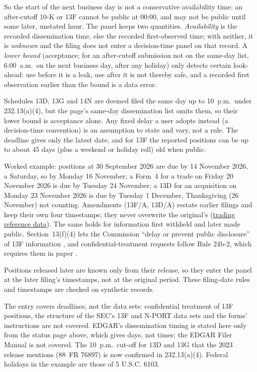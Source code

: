 \begin{qfdata}
So the start of the next business day is not a conservative availability time: an after-cutoff 10-K or 13F cannot be public at 00:00, and may not be public until some later, unstated hour. The panel keeps two quantities. \emph{Availability} is the recorded dissemination time, else the recorded first-observed time; with neither, it is \emph{unknown} and the filing does not enter a decision-time panel on that record. A \emph{lower bound} (acceptance; for an after-cutoff submission not on the same-day list, 6:00~a.m.\ on the next business day, after any holiday) only detects certain look-ahead: use before it is a leak, use after it is not thereby safe, and a recorded first observation earlier than the bound is a data error.

Schedules 13D, 13G and 14N are deemed filed the same day up to 10~p.m.\ under 232.13(a)(4), but the page's same-day dissemination list omits them, so their lower bound is acceptance alone. Any fixed delay a user adopts instead (a decision-time convention) is an assumption to state and vary, not a rule. The deadline gives only the latest date, and for 13F the reported positions can be up to about 45 days (plus a weekend or holiday roll) old when public.

Worked example: positions at 30 September 2026 are due by 14 November 2026, a Saturday, so by Monday 16 November; a Form~4 for a trade on Friday 20 November 2026 is due by Tuesday 24 November; a 13D for an acquisition on Monday 23 November 2026 is due by Tuesday 1 December, Thanksgiving (26 November) not counting. Amendments (13F/A, 13D/A) restate earlier filings and keep their own four timestamps; they never overwrite the original's (\hyperref[data:trading-reference-data]{trading reference data}). The same holds for information first withheld and later made public. Section~13(f)(4) lets the Commission ``delay or prevent public disclosure'' of 13F information \citep[15 U.S.C. 78m(f)(4), 2023 edition]{usc-15-78m}, and confidential-treatment requests follow Rule 24b-2, which requires them in paper \citep[17 CFR 240.24b-2, preamble]{ecfr-17cfr240-24b-2}.

Positions released later are known only from their release, so they enter the panel at the later filing's timestamps, not at the original period. These filing-date rules and timestamps are checked on synthetic records.

 The entry covers deadlines, not the data sets: confidential treatment of 13F positions, the structure of the SEC's 13F and N-PORT data sets and the forms' instructions are not covered. EDGAR's dissemination timing is stated here only from the status page above, which gives days, not times; the EDGAR Filer Manual is not covered. The 10~p.m.\ cut-off for 13D and 13G that the 2023 release mentions (88~FR 76897) is now confirmed in 232.13(a)(4). Federal holidays in the example are those of 5 U.S.C. 6103.


\end{qfdata}
